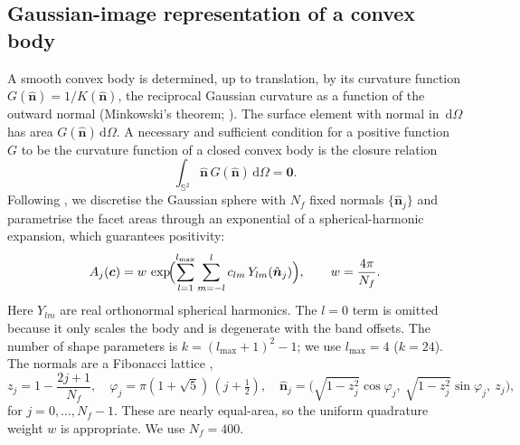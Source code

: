 \documentclass[11pt,a4paper]{article}
\theoremstyle{remark}
\newcommand{\vect}[1]{\bm{#1}}
\newcommand{\uv}[1]{\hat{\bm{#1}}}
\newcommand{\Sph}{\mathbb{S}^2}
\newcommand{\dd}{\,\mathrm{d}}
\begin{document}
\subsection{Gaussian-image representation of a convex body}
A smooth convex body is determined, up to translation, by its curvature function
$G(\uv n)=1/K(\uv n)$, the reciprocal Gaussian curvature as a function of the outward normal
(Minkowski's theorem; \citealp{schneider2014}). The surface element with normal in $\dd\Omega$ has area
$G(\uv n)\dd\Omega$. A necessary and sufficient condition for a positive function $G$ to be the
curvature function of a closed convex body is the closure relation
\begin{equation}
  \int_{\Sph} \uv n\,G(\uv n)\dd\Omega = \vect 0 .
  \label{eq:closure}
\end{equation}
Following \citet{kaasalainen2001a}, we discretise the Gaussian sphere with $N_f$ fixed normals
$\{\uv n_j\}$ and parametrise the facet areas through an exponential of a spherical-harmonic
expansion, which guarantees positivity:
\begin{equation}
  A_j(\vect c) = w\,\exp\!\Bigl(\sum_{l=1}^{l_{\max}}\sum_{m=-l}^{l} c_{lm}\,Y_{lm}(\uv n_j)\Bigr),
  \qquad w=\frac{4\pi}{N_f}.
  \label{eq:areas}
\end{equation}
Here $Y_{lm}$ are real orthonormal spherical harmonics. The $l=0$ term is omitted because it only
scales the body and is degenerate with the band offsets. The number of shape parameters is
$k=(l_{\max}+1)^2-1$; we use $l_{\max}=4$ ($k=24$). The normals are a Fibonacci lattice
\citep{gonzalez2010},
\begin{equation}
  z_j = 1-\frac{2j+1}{N_f},\quad \varphi_j = \pi(1+\sqrt5)\,(j+\tfrac12),\quad
  \uv n_j = \bigl(\sqrt{1-z_j^2}\cos\varphi_j,\ \sqrt{1-z_j^2}\sin\varphi_j,\ z_j\bigr),
\end{equation}
for $j=0,\dots,N_f-1$. These are nearly equal-area, so the uniform quadrature weight $w$ is
appropriate. We use $N_f=400$.
\end{document}
